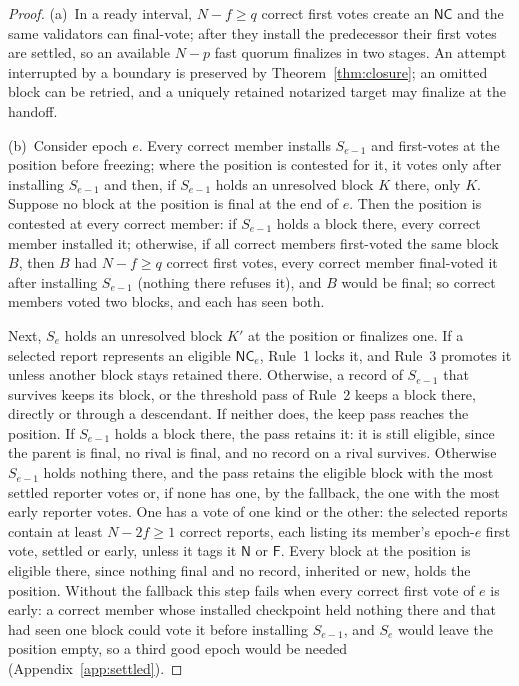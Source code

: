 \documentclass[conference]{IEEEtran}
\newcommand{\NC}{\mathsf{NC}}
\newcommand{\tagN}{\mathsf{N}}
\newcommand{\tagF}{\mathsf{F}}
\begin{document}
\begin{proof}
(a)~In a ready interval, $N-f\ge q$ correct first votes create an $\NC$ and the same validators can final-vote; after they install the predecessor their first votes are settled, so an available $N-p$ fast quorum finalizes in two stages. An attempt interrupted by a boundary is preserved by Theorem~\ref{thm:closure}; an omitted block can be retried, and a uniquely retained notarized target may finalize at the handoff.

(b)~Consider epoch $e$. Every correct member installs $S_{e-1}$ and first-votes at the position before freezing; where the position is contested for it, it votes only after installing $S_{e-1}$ and then, if $S_{e-1}$ holds an unresolved block $K$ there, only $K$. Suppose no block at the position is final at the end of $e$. Then the position is contested at every correct member: if $S_{e-1}$ holds a block there, every correct member installed it; otherwise, if all correct members first-voted the same block $B$, then $B$ had $N-f\ge q$ correct first votes, every correct member final-voted it after installing $S_{e-1}$ (nothing there refuses it), and $B$ would be final; so correct members voted two blocks, and each has seen both.

Next, $S_e$ holds an unresolved block $K'$ at the position or finalizes one. If a selected report represents an eligible $\NC_e$, Rule~1 locks it, and Rule~3 promotes it unless another block stays retained there. Otherwise, a record of $S_{e-1}$ that survives keeps its block, or the threshold pass of Rule~2 keeps a block there, directly or through a descendant. If neither does, the keep pass reaches the position. If $S_{e-1}$ holds a block there, the pass retains it: it is still eligible, since the parent is final, no rival is final, and no record on a rival survives. Otherwise $S_{e-1}$ holds nothing there, and the pass retains the eligible block with the most settled reporter votes or, if none has one, by the fallback, the one with the most early reporter votes. One has a vote of one kind or the other: the selected reports contain at least $N-2f\ge1$ correct reports, each listing its member's epoch-$e$ first vote, settled or early, unless it tags it $\tagN$ or $\tagF$. Every block at the position is eligible there, since nothing final and no record, inherited or new, holds the position. Without the fallback this step fails when every correct first vote of $e$ is early: a correct member whose installed checkpoint held nothing there and that had seen one block could vote it before installing $S_{e-1}$, and $S_e$ would leave the position empty, so a third good epoch would be needed (Appendix~\ref{app:settled}).


\end{proof}
\end{document}
